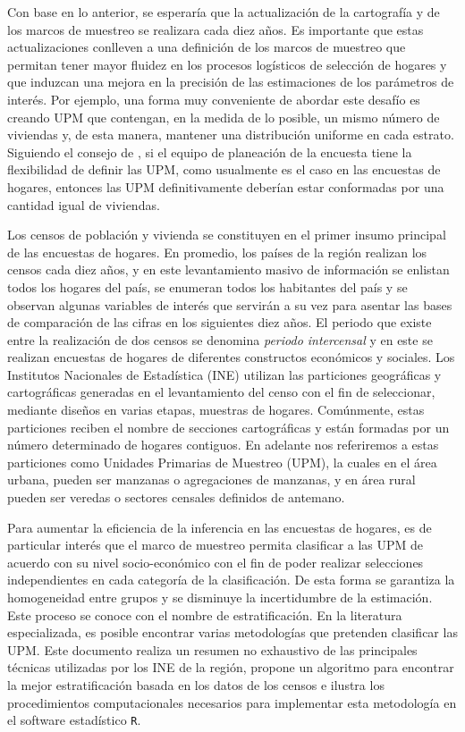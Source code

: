 \documentclass[12pt,spanish,]{book}
\begin{document}
Con base en lo anterior, se esperaría que la actualización de la cartografía y de los marcos de muestreo se realizara cada diez años. Es importante que estas actualizaciones conlleven a una definición de los marcos de muestreo que permitan tener mayor fluidez en los procesos logísticos de selección de hogares y que induzcan una mejora en la precisión de las estimaciones de los parámetros de interés. Por ejemplo, una forma muy conveniente de abordar este desafío es creando UPM que contengan, en la medida de lo posible, un mismo número de viviendas y, de esta manera, mantener una distribución uniforme en cada estrato. Siguiendo el consejo de \textcite[pág. 212]{Valliant_Dever_Kreuter_2013}, si el equipo de planeación de la encuesta tiene la flexibilidad de definir las UPM, como usualmente es el caso en las encuestas de hogares, entonces las UPM definitivamente deberían estar conformadas por una cantidad igual de viviendas.

Los censos de población y vivienda se constituyen en el primer insumo principal de las encuestas de hogares. En promedio, los países de la región realizan los censos cada diez años, y en este levantamiento masivo de información se enlistan todos los hogares del país, se enumeran todos los habitantes del país y se observan algunas variables de interés que servirán a su vez para asentar las bases de comparación de las cifras en los siguientes diez años. El periodo que existe entre la realización de dos censos se denomina \emph{periodo intercensal} y en este se realizan encuestas de hogares de diferentes constructos económicos y sociales. Los Institutos Nacionales de Estadística (INE) utilizan las particiones geográficas y cartográficas generadas en el levantamiento del censo con el fin de seleccionar, mediante diseños en varias etapas, muestras de hogares. Comúnmente, estas particiones reciben el nombre de secciones cartográficas y están formadas por un número determinado de hogares contiguos. En adelante nos referiremos a estas particiones como Unidades Primarias de Muestreo (UPM), la cuales en el área urbana, pueden ser manzanas o agregaciones de manzanas, y en área rural pueden ser veredas o sectores censales definidos de antemano.

Para aumentar la eficiencia de la inferencia en las encuestas de hogares, es de particular interés que el marco de muestreo permita clasificar a las UPM de acuerdo con su nivel socio-económico con el fin de poder realizar selecciones independientes en cada categoría de la clasificación. De esta forma se garantiza la homogeneidad entre grupos y se disminuye la incertidumbre de la estimación. Este proceso se conoce con el nombre de estratificación. En la literatura especializada, es posible encontrar varias metodologías que pretenden clasificar las UPM. Este documento realiza un resumen no exhaustivo de las principales técnicas utilizadas por los INE de la región, propone un algoritmo para encontrar la mejor estratificación basada en los datos de los censos e ilustra los procedimientos computacionales necesarios para implementar esta metodología en el software estadístico \texttt{R}.
\end{document}
